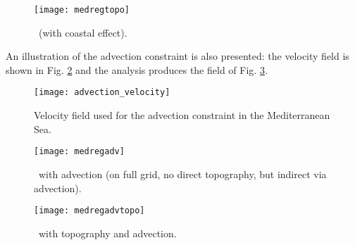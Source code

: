 \begin{figure}[H]
\centering
\parbox{.6\textwidth}{
\texttt{[image: medregtopo]}
}\parbox{.4\textwidth}{
\caption{\diva\, (with coastal effect).\label{fig:medregtopo} }
}
\end{figure}

An illustration of the advection constraint is also presented: the velocity field is shown in Fig. \ref{fig:medsea_vel} and the analysis produces the field of Fig. \ref{fig:medsea_adv}.

\begin{figure}[H]
\centering
\parbox{.6\textwidth}{
\texttt{[image: advection\_velocity]}
}\parbox{.4\textwidth}{
\caption{Velocity field used for the advection constraint in the Mediterranean Sea.\label{fig:medsea_vel}}
}
\end{figure}

\begin{figure}[H]
\centering
\parbox{.6\textwidth}{
\texttt{[image: medregadv]}
}\parbox{.4\textwidth}{
\caption{\diva\, with advection (on full grid, no direct topography, but indirect 
via advection).\label{fig:medsea_adv}}
}
\end{figure}


\begin{figure}[H]
\centering
\parbox{.6\textwidth}{
\texttt{[image: medregadvtopo]}
}\parbox{.4\textwidth}{
\caption{\diva\, with topography and advection.}
}
\end{figure}


